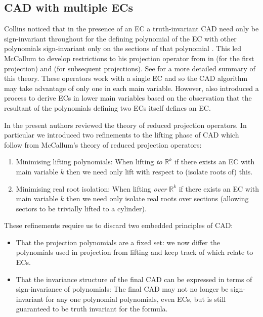 \documentclass{llncs}
\begin{document}
\subsection{CAD with multiple ECs}


Collins noticed that in the presence of an EC a truth-invariant CAD need only be sign-invariant throughout for the defining polynomial of the EC with other polynomials sign-invariant only on the sections of that polynomial \cite{Collins1998}. This led McCallum to develop restrictions to his projection operator from \cite{McCallum1998} in \cite{McCallum1999a} (for the first projection) and \cite{McCallum2001} (for subsequent projections).   See \cite[Section 2.1]{EBD15} for a more detailed summary of this theory.  These operators work with a single EC and so the CAD algorithm may take advantage of only one in each main variable.  
However, \cite{McCallum2001} also introduced a process to derive ECs in lower main variables based on the observation that the resultant of the polynomials defining two ECs itself defines an EC.  

In \cite{EBD15} the present authors reviewed the theory of reduced projection operators.  In particular we introduced two refinements to the lifting phase of CAD which follow from  McCallum's theory of reduced projection operators:
\begin{enumerate}
\item Minimising lifting polynomials: When lifting \emph{to} $\mathbb{R}^k$ if there exists an EC with main variable $k$ then we need only lift with respect to (isolate roots of) this.  
\item Minimising real root isolation: When lifting \emph{over} $\mathbb{R}^k$ if there exists an EC with main variable $k$ then we need only isolate real roots over sections (allowing sectors to be trivially lifted to a cylinder).
\end{enumerate}
These refinements require us to discard two embedded principles of CAD:
\begin{itemize}
\item That the projection polynomials are a fixed set: we now differ the polynomials used in projection from lifting and keep track of which relate to ECs. 
\item That the invariance structure of the final CAD can be expressed in terms of sign-invariance of polynomials:  The final CAD may not no longer be sign-invariant for any one polynomial polynomials, even ECs, but is still guaranteed to be truth invariant for the formula.  
\end{itemize}
\end{document}
